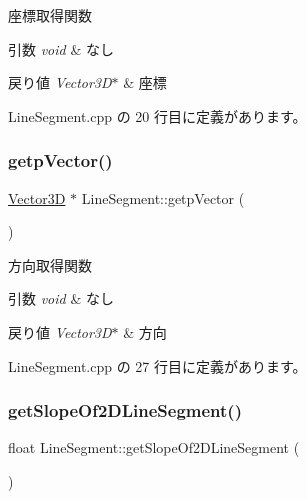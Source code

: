 座標取得関数 


\begin{DoxyParams}{引数}
{\em void} & なし \\
\hline
\end{DoxyParams}

\begin{DoxyRetVals}{戻り値}
{\em Vector3\+D$\ast$} & 座標 \\
\hline
\end{DoxyRetVals}


 Line\+Segment.\+cpp の 20 行目に定義があります。

\mbox{\label{class_line_segment_a773f1be1684f80f3f1ed6623462f76c6}} 
\subsubsection{\texorpdfstring{getp\+Vector()}{getpVector()}}
{\footnotesize\ttfamily \mbox{\hyperlink{class_vector3_d}{Vector3D}} $\ast$ Line\+Segment\+::getp\+Vector (\begin{DoxyParamCaption}{ }\end{DoxyParamCaption})}



方向取得関数 


\begin{DoxyParams}{引数}
{\em void} & なし \\
\hline
\end{DoxyParams}

\begin{DoxyRetVals}{戻り値}
{\em Vector3\+D$\ast$} & 方向 \\
\hline
\end{DoxyRetVals}


 Line\+Segment.\+cpp の 27 行目に定義があります。

\mbox{\label{class_line_segment_a473738a0b67e449cf8b5a23f1146f446}} 
\subsubsection{\texorpdfstring{get\+Slope\+Of2\+D\+Line\+Segment()}{getSlopeOf2DLineSegment()}}
{\footnotesize\ttfamily float Line\+Segment\+::get\+Slope\+Of2\+D\+Line\+Segment (\begin{DoxyParamCaption}{ }\end{DoxyParamCaption})}



